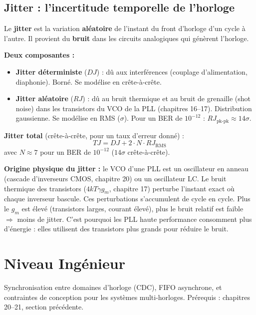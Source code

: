 \documentclass[12pt,a4paper,twoside]{book}
\begin{document}
\subsection{Jitter : l'incertitude temporelle de l'horloge}

\begin{formule}
Le \textbf{jitter} est la variation \textbf{aléatoire} de l'instant du front d'horloge d'un cycle à l'autre. Il provient du \textbf{bruit} dans les circuits analogiques qui génèrent l'horloge.

\textbf{Deux composantes :}
\begin{itemize}[nosep]
\item \textbf{Jitter déterministe} ($DJ$) : dû aux interférences (couplage d'alimentation, diaphonie). Borné. Se modélise en crête-à-crête.
\item \textbf{Jitter aléatoire} ($RJ$) : dû au bruit thermique et au bruit de grenaille (shot noise) dans les transistors du VCO de la PLL (chapitres 16--17). Distribution gaussienne. Se modélise en RMS ($\sigma$). Pour un BER de $10^{-12}$ : $RJ_{\text{pk-pk}} \approx 14\sigma$.
\end{itemize}

\textbf{Jitter total} (crête-à-crête, pour un taux d'erreur donné) :
\[
\boxed{TJ = DJ + 2 \cdot N \cdot RJ_{\text{RMS}}}
\]
avec $N \approx 7$ pour un BER de $10^{-12}$ ($14\sigma$ crête-à-crête).
\end{formule}

\begin{intuition}
\textbf{Origine physique du jitter :} le VCO d'une PLL est un oscillateur en anneau (cascade d'inverseurs CMOS, chapitre 20) ou un oscillateur LC. Le bruit thermique des transistors ($4kT\gamma g_m$, chapitre 17) perturbe l'instant exact où chaque inverseur bascule. Ces perturbations s'accumulent de cycle en cycle. Plus le $g_m$ est élevé (transistors larges, courant élevé), plus le bruit relatif est faible $\Rightarrow$ moins de jitter. C'est pourquoi les PLL haute performance consomment plus d'énergie : elles utilisent des transistors plus grands pour réduire le bruit.
\end{intuition}

\section{Niveau Ingénieur}

\begin{ingenieur}
Synchronisation entre domaines d'horloge (CDC), FIFO asynchrone, et contraintes de conception pour les systèmes multi-horloges. Prérequis : chapitres 20--21, section précédente.
\end{ingenieur}
\end{document}
